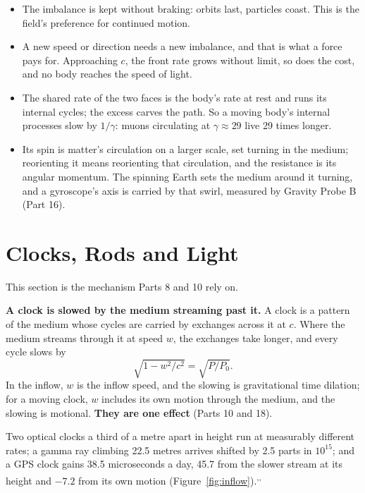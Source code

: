 \begin{itemize}
\item {} The imbalance is kept without braking: orbits last, particles coast. This is the field's preference for continued motion.
\item {} A new speed or direction needs a new imbalance, and that is what a force pays for. Approaching $c$, the front rate grows without limit, so does the cost, and no body reaches the speed of light.
\item {} The shared rate of the two faces is the body's rate at rest and runs its internal cycles; the excess carves the path. So a moving body's internal processes slow by $1/\gamma$: muons circulating at $\gamma \approx 29$ live 29 times longer.
\item {} Its spin is matter's circulation on a larger scale, set turning in the medium; reorienting it means reorienting that circulation, and the resistance is its angular momentum. The spinning Earth sets the medium around it turning, and a gyroscope's axis is carried by that swirl, measured by Gravity Probe B (Part 16).
\end{itemize}

\section{Clocks, Rods and Light}

This section is the mechanism Parts 8 and 10 rely on.

\begin{hypbar}
\textbf{A clock is slowed by the medium streaming past it.} A clock is a pattern of the medium whose cycles are carried by exchanges across it at $c$. Where the medium streams through it at speed $w$, the exchanges take longer, and every cycle slows by
\[ \sqrt{1 - w^2/c^2} = \sqrt{P/P_0}. \]
In the inflow, $w$ is the inflow speed, and the slowing is gravitational time dilation; for a moving clock, $w$ includes its own motion through the medium, and the slowing is motional. \textbf{They are one effect} (Parts 10 and 18).\footnotemark{}
\end{hypbar}

 Two optical clocks a third of a metre apart in height run at measurably different rates; a gamma ray climbing 22.5 metres arrives shifted by 2.5 parts in $10^{15}$; and a GPS clock gains 38.5 microseconds a day, 45.7 from the slower stream at its height and $-7.2$ from its own motion (Figure~\ref{fig:inflow}).\textsuperscript{,}\textsuperscript{,}

